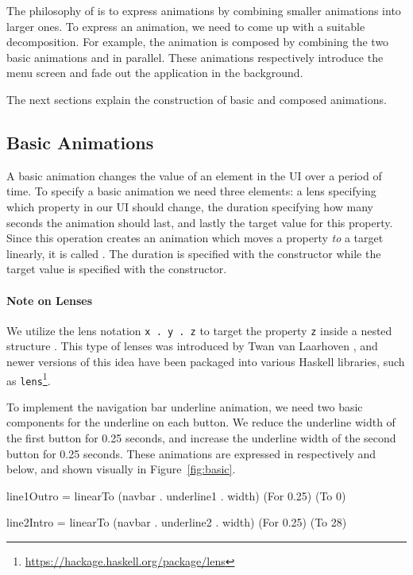 The philosophy of \dsl{} is to express animations by combining smaller animations into larger ones. To express an animation, we need to come up with a suitable decomposition. For example, the  animation is composed by combining the two basic animations  and  in parallel. These animations respectively introduce the menu screen and fade out the application in the background.

The next sections explain the construction of basic and composed animations.

\subsection{Basic Animations}

A basic animation changes the value of an element in the UI over a period of time. To specify a basic animation we need three elements: a lens specifying which property in our UI should change, the duration specifying how many seconds the animation should last, and lastly the target value for this property. Since this operation creates an animation which moves a property \emph{to} a target linearly, it is called . The duration is specified with the  constructor while the target value is specified with the  constructor.

\paragraph{Note on Lenses} We utilize the lens notation \texttt{x . y . z} to target the property \texttt{z} inside a nested structure . This type of lenses was introduced by Twan van Laarhoven \cite{vlLenses}, and newer versions of this idea have been packaged into various Haskell libraries, such as \texttt{lens}\footnote{\url{https://hackage.haskell.org/package/lens}}.

To implement the navigation bar underline animation, we need two basic components for the underline on each button. We reduce the underline width of the first button for 0.25 seconds, and increase the underline width of the second button for 0.25 seconds. These animations are expressed in respectively  and  below, and shown visually in Figure~\ref{fig:basic}.

\begin{spec}
line1Outro = linearTo (navbar . underline1 . width) (For 0.25) (To 0)

line2Intro = linearTo (navbar . underline2 . width) (For 0.25) (To 28)
\end{spec}

